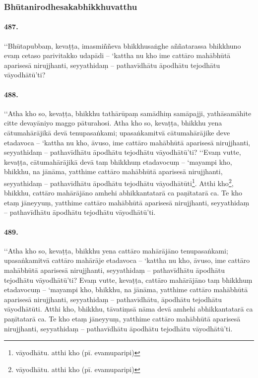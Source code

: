 \subsubsection{Bhūtanirodhesakabhikkhuvatthu}

\paragraph{487.} ‘‘Bhūtapubbaṃ, kevaṭṭa, imasmiññeva bhikkhusaṅghe aññatarassa bhikkhuno evaṃ cetaso parivitakko udapādi – ‘kattha nu kho ime cattāro mahābhūtā aparisesā nirujjhanti, seyyathidaṃ – pathavīdhātu āpodhātu tejodhātu vāyodhātū’ti?

\paragraph{488.} ‘‘Atha kho so, kevaṭṭa, bhikkhu tathārūpaṃ samādhiṃ samāpajji, yathāsamāhite citte devayāniyo maggo pāturahosi. Atha kho so, kevaṭṭa, bhikkhu yena cātumahārājikā devā tenupasaṅkami; upasaṅkamitvā cātumahārājike deve etadavoca – ‘kattha nu kho, āvuso, ime cattāro mahābhūtā aparisesā nirujjhanti, seyyathidaṃ – pathavīdhātu āpodhātu tejodhātu vāyodhātū’ti? ‘‘Evaṃ vutte, kevaṭṭa, cātumahārājikā devā taṃ bhikkhuṃ etadavocuṃ – ‘mayampi kho, bhikkhu, na jānāma, yatthime cattāro mahābhūtā aparisesā nirujjhanti, seyyathidaṃ – pathavīdhātu āpodhātu tejodhātu vāyodhātūti\footnote{vāyodhātu. atthi kho (pī. evamuparipi)}. Atthi kho\footnote{vāyodhātu. atthi kho (pī. evamuparipi)}, bhikkhu, cattāro mahārājāno amhehi abhikkantatarā ca paṇītatarā ca. Te kho etaṃ jāneyyuṃ, yatthime cattāro mahābhūtā aparisesā nirujjhanti, seyyathidaṃ – pathavīdhātu āpodhātu tejodhātu vāyodhātū’ti.

\paragraph{489.} ‘‘Atha kho so, kevaṭṭa, bhikkhu yena cattāro mahārājāno tenupasaṅkami; upasaṅkamitvā cattāro mahārāje etadavoca – ‘kattha nu kho, āvuso, ime cattāro mahābhūtā aparisesā nirujjhanti, seyyathidaṃ – pathavīdhātu āpodhātu tejodhātu vāyodhātū’ti? Evaṃ vutte, kevaṭṭa, cattāro mahārājāno taṃ bhikkhuṃ etadavocuṃ – ‘mayampi kho, bhikkhu, na jānāma, yatthime cattāro mahābhūtā aparisesā nirujjhanti, seyyathidaṃ – pathavīdhātu, āpodhātu tejodhātu vāyodhātūti. Atthi kho, bhikkhu, tāvatiṃsā nāma devā amhehi abhikkantatarā ca paṇītatarā ca. Te kho etaṃ jāneyyuṃ, yatthime cattāro mahābhūtā aparisesā nirujjhanti, seyyathidaṃ – pathavīdhātu āpodhātu tejodhātu vāyodhātū’ti.

